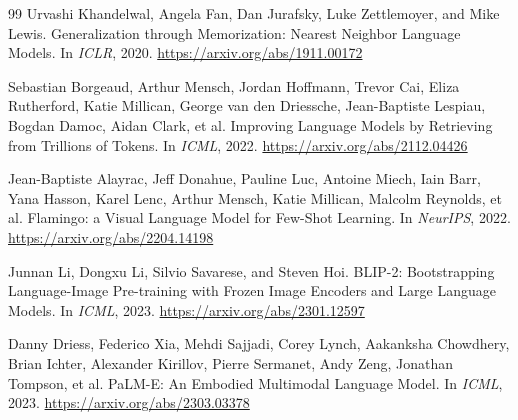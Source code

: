 \documentclass[11pt]{article}
\begin{document}
\begin{thebibliography}{99}
Urvashi Khandelwal, Angela Fan, Dan Jurafsky, Luke Zettlemoyer, and Mike Lewis.
\newblock Generalization through Memorization: Nearest Neighbor Language Models.
\newblock In \emph{ICLR}, 2020.
\newblock \url{https://arxiv.org/abs/1911.00172}

Sebastian Borgeaud, Arthur Mensch, Jordan Hoffmann, Trevor Cai, Eliza Rutherford, Katie Millican, George van den Driessche, Jean-Baptiste Lespiau, Bogdan Damoc, Aidan Clark, et al.
\newblock Improving Language Models by Retrieving from Trillions of Tokens.
\newblock In \emph{ICML}, 2022.
\newblock \url{https://arxiv.org/abs/2112.04426}

Jean-Baptiste Alayrac, Jeff Donahue, Pauline Luc, Antoine Miech, Iain Barr, Yana Hasson, Karel Lenc, Arthur Mensch, Katie Millican, Malcolm Reynolds, et al.
\newblock Flamingo: a Visual Language Model for Few-Shot Learning.
\newblock In \emph{NeurIPS}, 2022.
\newblock \url{https://arxiv.org/abs/2204.14198}

Junnan Li, Dongxu Li, Silvio Savarese, and Steven Hoi.
\newblock BLIP-2: Bootstrapping Language-Image Pre-training with Frozen Image Encoders and Large Language Models.
\newblock In \emph{ICML}, 2023.
\newblock \url{https://arxiv.org/abs/2301.12597}

Danny Driess, Federico Xia, Mehdi Sajjadi, Corey Lynch, Aakanksha Chowdhery, Brian Ichter, Alexander Kirillov, Pierre Sermanet, Andy Zeng, Jonathan Tompson, et al.
\newblock PaLM-E: An Embodied Multimodal Language Model.
\newblock In \emph{ICML}, 2023.
\newblock \url{https://arxiv.org/abs/2303.03378}

\end{thebibliography}
\end{document}
